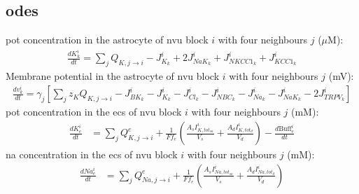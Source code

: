 \documentclass[11pt]{elsarticle}
\newcommand{\uM}{$\mu$M\xspace}
\newcommand{\na}{\gls{na}\xspace}
\newcommand{\pot}{\gls{pot}\xspace}
\begin{document}
\subsection{\Glspl{ode}}
%
\pot concentration in the astrocyte of \gls{nvu} block $i$ with four neighbours $j$ (\uM):
\begin{align}
\frac{d K_k^i}{dt} = \sum_j Q_{K,j \to i} - J_{K_k}^i + 2 J_{NaK_{k}}^i + J_{NKCC1_{k}}^i +  J_{KCC1_{k}}^i
\end{align}
%
Membrane potential in the astrocyte of \gls{nvu} block $i$ with four neighbours $j$ (mV):
\begin{align}
\frac{d v_k^i}{dt} = \gamma_j \left[ \sum_j z_K Q_{K,j \to i} -J_{BK_k}^i - J_{K_k}^i - J_{Cl_k}^i - J_{NBC_k}^i - J_{Na_k}^i - J_{NaK_k}^i - 2J_{TRPV_k}^i \right]
\end{align}
%
\pot concentration in the \gls{ecs} of \gls{nvu} block $i$ with four neighbours $j$ (mM):
\begin{align}
\frac{dK_{e}^i}{dt} &= \sum_j Q^{e}_{K,j\to i} + \frac{1}{F f_e} \left( \frac{A_s I_{K,tot_{sa}}^i}{V_s} + \frac{A_d I_{K,tot_d}^i}{V_d} \right) - \frac{d \text{Buff}^i_e}{dt}
\end{align}
%
\na concentration in the \gls{ecs} of \gls{nvu} block $i$ with four neighbours $j$ (mM):
\begin{align}
\frac{d Na_e^i}{dt} &= \sum_j Q^{e}_{Na,j\to i} + \frac{1}{F f_e} \left( \frac{A_s I_{Na,tot_{sa}}^i}{V_s} + \frac{A_d I_{Na,tot_d}^i}{V_d} \right)
\end{align}
%
\end{document}
